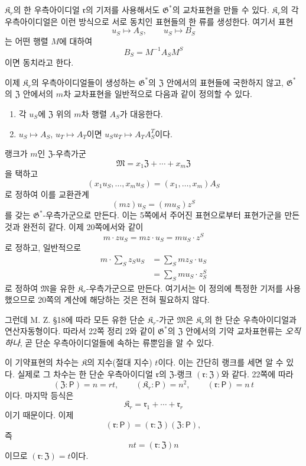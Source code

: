 \(\mathfrak K_r\)의 한 우측아이디얼 \(\mathfrak r\)의 기저를 사용해서도 \(\mathfrak G^*\)의 교차표현을 만들 수 있다. \(\mathfrak K_r\)의 각 우측아이디얼은 이런 방식으로 서로 동치인 표현들의 한 류를 생성한다. 여기서 표현
\[
        u_S\longmapsto A_S,
        \qquad
        u_S\longmapsto B_S
\]
는 어떤 행렬 \(M\)에 대하여
\[
        B_S=M^{-1}A_SM^S
\]
이면 동치라고 한다.

이제 \(\mathfrak K_r\)의 우측아이디얼들이 생성하는 \(\mathfrak G^*\)의 \(\mathfrak Z\) 안에서의 표현들에 국한하지 않고, \(\mathfrak G^*\)의 \(\mathfrak Z\) 안에서의 \(m\)차 교차표현을 일반적으로 다음과 같이 정의할 수 있다.
\begin{enumerate}
\item 각 \(u_S\)에 \(\mathfrak Z\) 위의 \(m\)차 행렬 \(A_S\)가 대응한다.
\item \(u_S\mapsto A_S\), \(u_T\mapsto A_T\)이면 \(u_Su_T\mapsto A_TA_S^T\)이다.
\end{enumerate}

랭크가 \(m\)인 \(\mathfrak Z\)-우측가군
\[
        \mathfrak M
        =x_1\mathfrak Z+\cdots+x_m\mathfrak Z
\]
을 택하고
\[
        (x_1u_S,\ldots,x_mu_S)
        =(x_1,\ldots,x_m)A_S
\]
로 정하여 이를 교환관계
\[
        (mz)u_S=(mu_S)z^S
\]
를 갖는 \(\mathfrak G^*\)-우측가군으로 만든다. 이는 5쪽에서 주어진 표현으로부터 표현가군을 만든 것과 완전히 같다. 이제 20쪽에서와 같이
\[
        m\mathbin{\cdot}zu_S
        =mz\mathbin{\cdot}u_S
        =mu_S\mathbin{\cdot}z^S
\]
로 정하고, 일반적으로
\[
\begin{aligned}
m\mathbin{\cdot}\sum_Sz_Su_S
 &=\sum_Smz_S\mathbin{\cdot}u_S\\
 &=\sum_Smu_S\mathbin{\cdot}z_S^S
\end{aligned}
\]
로 정하여 \(\mathfrak M\)을 유한 \(\mathfrak K_r\)-우측가군으로 만든다. 여기서는 이 정의에 특정한 기저를 사용했으므로 20쪽의 계산에 해당하는 것은 전혀 필요하지 않다.

그런데 M. Z. §18에 따라 모든 유한 단순 \(\mathfrak K_r\)-가군 \(\mathfrak M\)은 \(\mathfrak K_r\)의 한 단순 우측아이디얼과 연산자동형이다. 따라서 22쪽 정리 2와 같이 \(\mathfrak G^*\)의 \(\mathfrak Z\) 안에서의 기약 교차표현류는 \emph{오직 하나}, 곧 단순 우측아이디얼들에 속하는 류뿐임을 알 수 있다.

이 기약표현의 차수는 \(\mathfrak K\)의 지수(절대 지수) \(t\)이다. 이는 간단히 랭크를 세면 알 수 있다. 실제로 그 차수는 한 단순 우측아이디얼 \(\mathfrak r\)의 \(\mathfrak Z\)-랭크 \((\mathfrak r:\mathfrak Z)\)와 같다. 22쪽에 따라
\[
        (\mathfrak Z:\mathsf P)=n=rt,
        \qquad
        (\mathfrak K_r:\mathsf P)=n^2,
        \qquad
        (\mathfrak r:\mathsf P)=n\,t
\]
이다. 마지막 등식은
\[
        \mathfrak K_r
        =\mathfrak r_1+\cdots+\mathfrak r_r
\]
이기 때문이다. 이제
\[
        (\mathfrak r:\mathsf P)
        =(\mathfrak r:\mathfrak Z)
         (\mathfrak Z:\mathsf P),
\]
즉
\[
        nt=(\mathfrak r:\mathfrak Z)n
\]
이므로 \((\mathfrak r:\mathfrak Z)=t\)이다.

